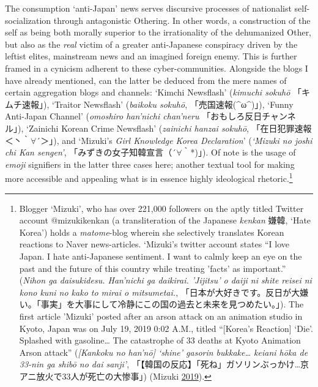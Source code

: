 \documentclass[10pt,british,A4paper,,openany]{memoir}
\begin{document}
The consumption `anti-Japan' news serves discursive processes of
nationalist self-socialization through antagonistic Othering. In other
words, a construction of the self as being both morally superior to the
irrationality of the dehumanized Other, but also as the \emph{real}
victim of a greater anti-Japanese conspiracy driven by the leftist
elites, mainstream news and an imagined foreign enemy. This is further
framed in a cynicism adherent to these cyber-communities. Alongside the
blogs I have already mentioned, can the latter be deduced from the mere
names of certain aggregation blogs and channels: `Kimchi Newsflash'
(\emph{kimuchi sokuhō} 「キムチ速報」), `Traitor Newsflash'
(\emph{baikoku sokuhō}, 「売国速報(\^{}ω\^{})」), `Funny Anti-Japan
Channel' (\emph{omoshiro han'nichi chan'neru}
「おもしろ反日チャンネル」), `Zainichi Korean Crime Newsflash'
(\emph{zainichi hanzai sokuhō}, 「在日犯罪速報＜丶｀\(\forall\)´＞」),
and `Mizuki's \emph{Girl Knowledge Korea Declaration}' (\emph{`Mizuki no
joshi chi Kan sengen'}, 「みずきの女子知韓宣言（´\(\forall\)｀*)」). Of
note is the usage of \emph{emoji} signifiers in the latter three cases
here; another textual tool for making more accessible and appealing what
is in essence highly ideological rhetoric.\footnote{Blogger `Mizuki',
  who has over 221,000 followers on the aptly titled Twitter account
  @mizukikenkan (a transliteration of the Japanese \emph{kenkan} 嫌韓,
  `Hate Korea') holds a \emph{matome}-blog wherein she selectively
  translates Korean reactions to Naver news-articles. `Mizuki's twitter
  account states ``I love Japan. I hate anti-Japanese sentiment. I want
  to calmly keep an eye on the past and the future of this country while
  treating 'facts' as important.'' (\emph{Nihon ga daisukidesu.
  Han'nichi ga daikirai. 'Jijitsu' o daiji ni shite reisei ni kono kuni
  no kako to mirai o mitsumetai.},
  「日本が大好きです。反日が大嫌い。「事実」を大事にして冷静にこの国の過去と未来を見つめたい。」).
  The first article 'Mizuki' posted after an arson attack on an
  animation studio in Kyoto, Japan was on July 19, 2019 0:02 A.M.,
  titled ``{[}Korea's Reaction{]} `Die'. Splashed with gasoline\ldots{}
  The catastrophe of 33 deaths at Kyoto Animation Arson attack''
  (\emph{{[}Kankoku no han'nō{]} `shine' gasorin bukkake\ldots{} keiani
  hōka de 33-nin ga shibō no dai sanji'},
  「【韓国の反応】「死ね」ガソリンぶっかけ\ldots{}京アニ放火で33人が死亡の大惨事」)
  (Mizuki \protect\hyperlink{ref-mizuki_eng._2019}{2019}).}
\end{document}
